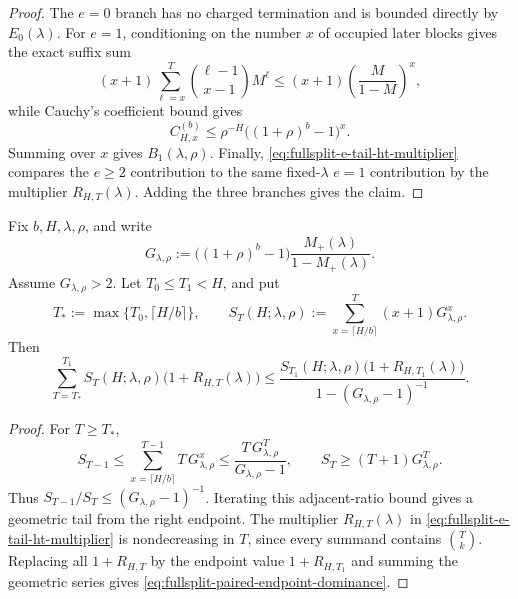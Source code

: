 \begin{proof}
The \(e=0\) branch has no charged termination and is bounded directly by \(E_0(\lambda)\).  For \(e=1\), conditioning on
the number \(x\) of occupied later blocks gives the exact suffix sum
\[
(x+1)\sum_{\ell=x}^{T}\binom{\ell-1}{x-1}M^\ell
\le
(x+1)\left(\frac{M}{1-M}\right)^x,
\]
while Cauchy's coefficient bound gives
\[
C_{H,x}^{(b)}
\le
\rho^{-H}\big((1+\rho)^b-1\big)^x .
\]
Summing over \(x\) gives \(B_1(\lambda,\rho)\).  Finally,
\eqref{eq:fullsplit-e-tail-ht-multiplier} compares the \(e\ge2\) contribution to the same fixed-\(\lambda\) \(e=1\)
contribution by the multiplier \(R_{H,T}(\lambda)\).  Adding the three branches gives the claim.
\end{proof}

\begin{lemma}
\label{lem:fullsplit-paired-endpoint-dominance}
Fix \(b,H,\lambda,\rho\), and write
\[
G_{\lambda,\rho}:=
\big((1+\rho)^b-1\big)\frac{M_+(\lambda)}{1-M_+(\lambda)}.
\]
Assume \(G_{\lambda,\rho}>2\).  Let \(T_0\le T_1 < H\), and put
\[
T_*:=\max\{T_0,\lceil H/b\rceil\},\qquad
S_T(H;\lambda,\rho):=
\sum_{x=\lceil H/b\rceil}^{T}(x+1)G_{\lambda,\rho}^x .
\]
Then
\begin{equation}
\label{eq:fullsplit-paired-endpoint-dominance}
\sum_{T=T_*}^{T_1}
S_T(H;\lambda,\rho)\bigl(1+R_{H,T}(\lambda)\bigr)
\le
\frac{
S_{T_1}(H;\lambda,\rho)\bigl(1+R_{H,T_1}(\lambda)\bigr)
}{
1-(G_{\lambda,\rho}-1)^{-1}
}.
\end{equation}
\end{lemma}

\begin{proof}
For \(T\ge T_*\),
\[
S_{T-1}
\le
\sum_{x=\lceil H/b\rceil}^{T-1}T\,G_{\lambda,\rho}^x
\le
\frac{T\,G_{\lambda,\rho}^{T}}{G_{\lambda,\rho}-1},
\qquad
S_T\ge (T+1)G_{\lambda,\rho}^{T}.
\]
Thus \(S_{T-1}/S_T\le (G_{\lambda,\rho}-1)^{-1}\).  Iterating this adjacent-ratio bound gives a geometric tail
from the right endpoint.  The multiplier \(R_{H,T}(\lambda)\) in
\eqref{eq:fullsplit-e-tail-ht-multiplier} is nondecreasing in \(T\), since every summand contains
\(\binom{T}{k}\).  Replacing all \(1+R_{H,T}\) by the endpoint value \(1+R_{H,T_1}\) and summing the geometric series
gives \eqref{eq:fullsplit-paired-endpoint-dominance}.
\end{proof}

